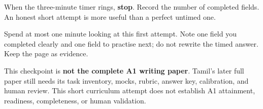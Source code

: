 When the three-minute timer rings, \textbf{stop}. Record the number of completed fields. An honest short attempt is more useful than a perfect untimed one.

\begin{tcolorbox}[breakable,colback=teal!4,colframe=teal!35!black,title={Before you move on}]
Spend at most one minute looking at this first attempt. Note one field you completed clearly and one field to practise next; do not rewrite the timed answer. Keep the page as evidence.

This checkpoint is \textbf{not the complete A1 writing paper}. Tamil's later full paper still needs its task inventory, mocks, rubric, answer key, calibration, and human review. This short curriculum attempt does not establish A1 attainment, readiness, completeness, or human validation.
\end{tcolorbox}
